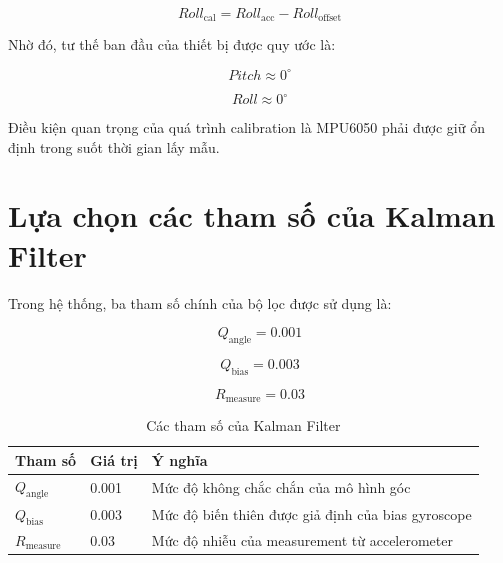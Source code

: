 \documentclass[a4paper,12pt]{report}
\begin{document}
\begin{equation}
Roll_{\text{cal}}
=
Roll_{\text{acc}}
-
Roll_{\text{offset}}
\end{equation}

Nhờ đó, tư thế ban đầu của thiết bị được quy ước là:

\begin{equation}
Pitch\approx0^\circ
\end{equation}

\begin{equation}
Roll\approx0^\circ
\end{equation}

Điều kiện quan trọng của quá trình calibration là MPU6050 phải được giữ ổn định trong suốt thời gian lấy mẫu.


\section{Lựa chọn các tham số của Kalman Filter}
\label{sec:kalman-parameters}

Trong hệ thống, ba tham số chính của bộ lọc được sử dụng là:

\begin{equation}
Q_{\text{angle}}=0.001
\end{equation}

\begin{equation}
Q_{\text{bias}}=0.003
\end{equation}

\begin{equation}
R_{\text{measure}}=0.03
\end{equation}

\begin{table}[H]
    \centering
    \caption{Các tham số của Kalman Filter}
    \label{tab:kalman-parameters}
    \begin{tabular}{p{4cm} p{3cm} p{7cm}}
        \toprule
        \textbf{Tham số}
        & \textbf{Giá trị}
        & \textbf{Ý nghĩa} \\
        \midrule
        $Q_{\text{angle}}$
        & 0.001
        & Mức độ không chắc chắn của mô hình góc \\

        $Q_{\text{bias}}$
        & 0.003
        & Mức độ biến thiên được giả định của bias gyroscope \\

        $R_{\text{measure}}$
        & 0.03
        & Mức độ nhiễu của measurement từ accelerometer \\
        \bottomrule
    \end{tabular}
\end{table}
\end{document}
